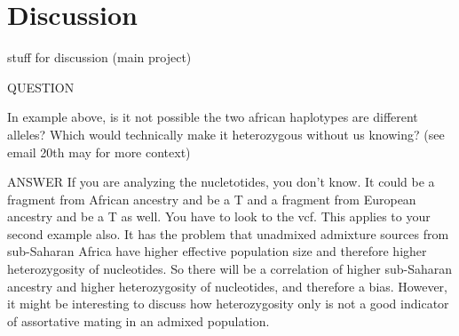 \documentclass[11pt]{article}
\begin{document}
\section{Discussion}












stuff for discussion (main project)

QUESTION

In example above, is it not possible the two african haplotypes are different alleles? Which would technically make it heterozygous without us knowing?
(see email 20th may for more context)

ANSWER
If you are analyzing the nucletotides, you don't know. It could be a fragment from African ancestry and be a T and a fragment from European ancestry and be a T as well. You have to look to the vcf. This applies to your second example also.
It has the problem that unadmixed admixture sources from sub-Saharan Africa have higher effective population size and therefore higher heterozygosity of nucleotides. So there will be a correlation of higher sub-Saharan ancestry and higher heterozygosity of nucleotides, and therefore a bias. However, it might be interesting to discuss how heterozygosity only is not a good indicator of assortative mating in an admixed population. 
\end{document}
